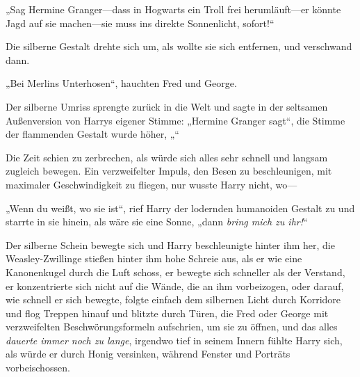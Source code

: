 „Sag Hermine Granger—dass in Hogwarts ein Troll frei herumläuft—er könnte Jagd auf sie machen—sie muss ins direkte Sonnenlicht, sofort!“

Die silberne Gestalt drehte sich um, als wollte sie sich entfernen, und verschwand dann.

„Bei Merlins Unterhosen“, hauchten Fred und George.

Der silberne Umriss sprengte zurück in die Welt und sagte in der seltsamen Außenversion von Harrys eigener Stimme:
„Hermine Granger sagt“, die Stimme der flammenden Gestalt wurde höher, „“

Die Zeit schien zu zerbrechen, als würde sich alles sehr schnell und langsam zugleich bewegen. Ein verzweifelter Impuls, den Besen zu beschleunigen, mit maximaler Geschwindigkeit zu fliegen, nur wusste Harry nicht, wo—

„Wenn du weißt, wo sie ist“, rief Harry der lodernden humanoiden Gestalt zu und starrte in sie hinein, als wäre sie eine Sonne, „dann \emph{bring mich zu ihr!}“

Der silberne Schein bewegte sich und Harry beschleunigte hinter ihm her, die Weasley-Zwillinge stießen hinter ihm hohe Schreie aus, als er wie eine Kanonenkugel durch die Luft schoss, er bewegte sich schneller als der Verstand, er konzentrierte sich nicht auf die Wände, die an ihm vorbeizogen, oder darauf, wie schnell er sich bewegte, folgte einfach dem silbernen Licht durch Korridore und flog Treppen hinauf und blitzte durch Türen, die Fred oder George mit verzweifelten Beschwörungsformeln aufschrien, um sie zu öffnen, und das alles \emph{dauerte immer noch zu lange}, irgendwo tief in seinem Innern fühlte Harry sich, als würde er durch Honig versinken, während Fenster und Porträts vorbeischossen.

